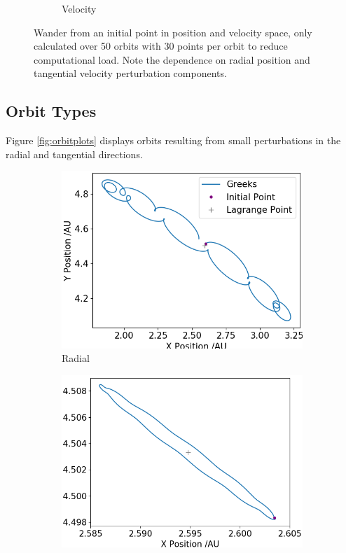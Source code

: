 \documentclass[11pt, a4paper,twocolumn]{article} %
\begin{document}
\begin{figure}[ht]
\begin{subfigure}{.45\textwidth}
		\caption{Velocity}
		\label{fig:velocity_mesh}
	\end{subfigure}
	\caption{Wander from an initial point in position and velocity space, only calculated over 50 orbits with 30 points per orbit to reduce computational load. Note the dependence on radial position and tangential velocity perturbation components. }
	\label{fig:mesh_plots}
\end{figure}

\subsection{Orbit Types}
Figure \ref{fig:orbitplots} displays orbits resulting from small perturbations in the radial and tangential directions.

\begin{figure}[ht]
	\centering
	\begin{subfigure}{.23\textwidth}
		\centering
		\includegraphics[width=\linewidth]{Figures/radialp_orbits}  
		\caption{Radial}
		\label{fig:orbit_rad}
	\end{subfigure}
	\hfill %
	\begin{subfigure}{.23\textwidth}
		\centering
		\includegraphics[width=\linewidth]{Figures/tangentialp_orbits}  

\end{subfigure}
\end{figure}
\end{document}
